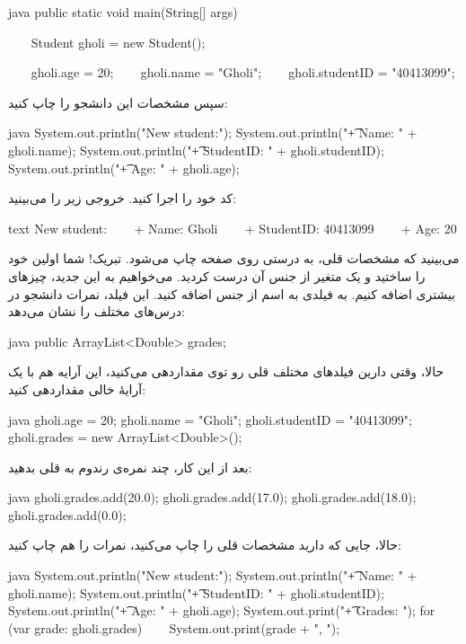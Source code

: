 \begin{codebox}{java}
public static void main(String[] args) {  
    Student gholi = new Student();  
  
    gholi.age = 20;  
    gholi.name = "Gholi";  
    gholi.studentID = "40413099";  
}
\end{codebox}

سپس مشخصات این دانشجو را چاپ کنید:

\begin{codebox}{java}
System.out.println("New student:");  
System.out.println("\t+ Name: " + gholi.name);  
System.out.println("\t+ StudentID: " + gholi.studentID);  
System.out.println("\t+ Age: " + gholi.age);
\end{codebox}

کد خود را اجرا کنید. خروجی زیر را می‌بینید:

\begin{codebox}{text}
New student:  
    + Name: Gholi  
    + StudentID: 40413099  
    + Age: 20
\end{codebox}

می‌بینید که مشخصات قلی، به درستی روی صفحه چاپ می‌شود. تبریک! شما اولین
 خود را ساختید و یک متغیر از جنس آن درست کردید. می‌خواهیم به این
 جدید، چیزهای بیشتری اضافه کنیم. به  فیلدی
به اسم  از جنس  اضافه
کنید. این فیلد، نمرات دانشجو در درس‌های مختلف را نشان می‌دهد:

\begin{codebox}{java}
public ArrayList<Double> grades;
\end{codebox}

حالا، وقتی دارین فیلدهای مختلف قلی رو توی  مقداردهی
می‌کنید، این آرایه هم با یک آرایهٔ خالی مقداردهی کنید:

\begin{codebox}{java}
gholi.age = 20;  
gholi.name = "Gholi";  
gholi.studentID = "40413099";  
gholi.grades = new ArrayList<Double>();
\end{codebox}

بعد از این کار، چند نمره‌ی رندوم به قلی بدهید:

\begin{codebox}{java}
gholi.grades.add(20.0);  
gholi.grades.add(17.0);  
gholi.grades.add(18.0);  
gholi.grades.add(0.0);
\end{codebox}

حالا، جایی که دارید مشخصات قلی را چاپ می‌کنید، نمرات را هم چاپ کنید:

\begin{codebox}{java}
System.out.println("New student:");  
System.out.println("\t+ Name: " + gholi.name);  
System.out.println("\t+ StudentID: " + gholi.studentID);  
System.out.println("\t+ Age: " + gholi.age);  
System.out.print("\t+ Grades: ");
for (var grade: gholi.grades) {  
    System.out.print(grade + ", ");  
}
\end{codebox}

